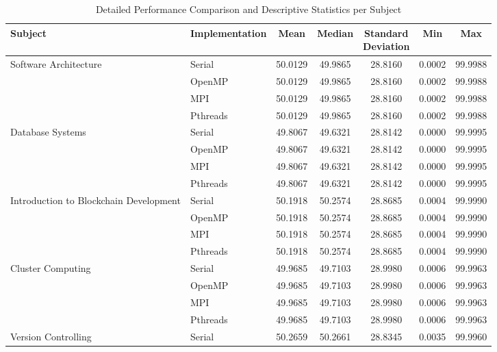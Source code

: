 \documentclass[12pt,a4paper]{article}
\begin{document}
\begin{table}[H]
\centering
\small
\setlength{\tabcolsep}{4.0pt}
\renewcommand{\arraystretch}{1.15}
\caption{Detailed Performance Comparison and Descriptive Statistics per Subject}
\label{tab:class_subject_statistics}
\begin{tabular}{|p{3.8cm}|l|c|c|c|c|c|}
\hline
\textbf{Subject} & \textbf{Implementation} & \textbf{Mean} & \textbf{Median} & \makecell[c]{\textbf{Standard}\\\textbf{Deviation}} & \textbf{Min} & \textbf{Max} \\ \hline
\multirow{4}{3.8cm}{Software Architecture} & Serial & 50.0129 & 49.9865 & 28.8160 & 0.0002 & 99.9988 \\ \cline{2-7}
 & OpenMP & 50.0129 & 49.9865 & 28.8160 & 0.0002 & 99.9988 \\ \cline{2-7}
 & MPI & 50.0129 & 49.9865 & 28.8160 & 0.0002 & 99.9988 \\ \cline{2-7}
 & Pthreads & 50.0129 & 49.9865 & 28.8160 & 0.0002 & 99.9988 \\ \hline
\multirow{4}{3.8cm}{Database Systems} & Serial & 49.8067 & 49.6321 & 28.8142 & 0.0000 & 99.9995 \\ \cline{2-7}
 & OpenMP & 49.8067 & 49.6321 & 28.8142 & 0.0000 & 99.9995 \\ \cline{2-7}
 & MPI & 49.8067 & 49.6321 & 28.8142 & 0.0000 & 99.9995 \\ \cline{2-7}
 & Pthreads & 49.8067 & 49.6321 & 28.8142 & 0.0000 & 99.9995 \\ \hline
\multirow{4}{3.8cm}{Introduction to Blockchain Development} & Serial & 50.1918 & 50.2574 & 28.8685 & 0.0004 & 99.9990 \\ \cline{2-7}
 & OpenMP & 50.1918 & 50.2574 & 28.8685 & 0.0004 & 99.9990 \\ \cline{2-7}
 & MPI & 50.1918 & 50.2574 & 28.8685 & 0.0004 & 99.9990 \\ \cline{2-7}
 & Pthreads & 50.1918 & 50.2574 & 28.8685 & 0.0004 & 99.9990 \\ \hline
\multirow{4}{3.8cm}{Cluster Computing} & Serial & 49.9685 & 49.7103 & 28.9980 & 0.0006 & 99.9963 \\ \cline{2-7}
 & OpenMP & 49.9685 & 49.7103 & 28.9980 & 0.0006 & 99.9963 \\ \cline{2-7}
 & MPI & 49.9685 & 49.7103 & 28.9980 & 0.0006 & 99.9963 \\ \cline{2-7}
 & Pthreads & 49.9685 & 49.7103 & 28.9980 & 0.0006 & 99.9963 \\ \hline
\multirow{4}{3.8cm}{Version Controlling} & Serial & 50.2659 & 50.2661 & 28.8345 & 0.0035 & 99.9960 \\ \cline{2-7}

\end{tabular}
\end{table}
\end{document}
